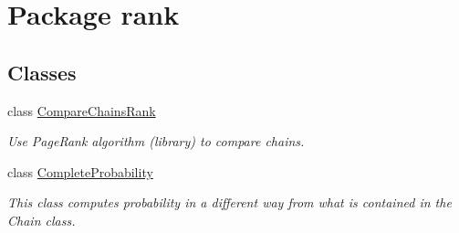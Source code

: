 \hypertarget{namespacerank}{}\section{Package rank}
\label{namespacerank}
\subsection*{Classes}
\begin{DoxyCompactItemize}
\item 
class \hyperlink{classrank_1_1_compare_chains_rank}{Compare\+Chains\+Rank}
\begin{DoxyCompactList}\small\item\em Use Page\+Rank algorithm (library) to compare chains. \end{DoxyCompactList}\item 
class \hyperlink{classrank_1_1_complete_probability}{Complete\+Probability}
\begin{DoxyCompactList}\small\item\em This class computes probability in a different way from what is contained in the Chain class. \end{DoxyCompactList}\end{DoxyCompactItemize}
